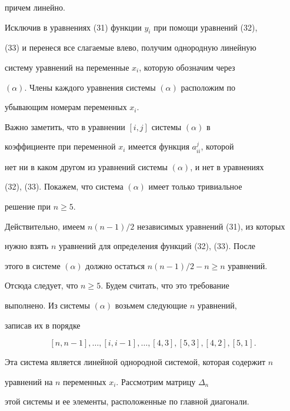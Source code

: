 причем линейно. 


 


Исключив в уравнениях (31) функции $y_i$ при помощи уравнений (32), 


(33) и перенеся все слагаемые влево, получим однородную линейную 


систему уравнений на переменные $x_i$, которую обозначим через 


$(\alpha)$. Члены каждого уравнения системы $(\alpha)$ расположим по 


убывающим номерам переменных $x_i$. 


 


Важно заметить, что в уравнении $[i,j]$ системы $(\alpha)$ в 


коэффициенте при переменной $x_i$ имеется функция $a^j_{ii}$, которой 


нет ни в каком другом из уравнений системы $(\alpha)$, и нет в уравнениях 


(32), (33). Покажем, что система $(\alpha)$ имеет только тривиальное 


решение при $n\ge5$. 


 


Действительно, имеем $n(n-1)/2$ независимых уравнений (31), из которых 


нужно взять $n$ уравнений для определения функций (32), (33). После 


этого в системе $(\alpha)$ должно остаться $n(n-1)/2-n\ge n$ уравнений. 


Отсюда следует, что $n\ge5$. Будем считать, что это требование 


выполнено. Из системы $(\alpha)$ возьмем следующие $n$ уравнений, 


записав их в порядке 


\begin{equation} 


[n,n-1],\dotsc,[i,i-1],\dotsc,[4,3],[5,3],[4,2],[5,1]. 


\end{equation} 


Эта система является линейной однородной системой, которая содержит $n$ 


уравнений на $n$ переменных $x_i$. Рассмотрим матрицу $\Delta_n$ 


этой системы и ее элементы, расположенные по главной диагонали. 


